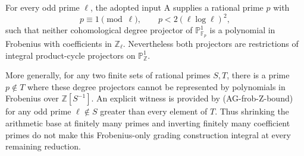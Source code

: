 \begin{proposition}
For every odd prime $\ell$, the adopted input A supplies
a rational prime $p$ with
\[
                p\equiv1\pmod\ell,
                     \qquad p<2(\ell\log\ell)^2,
\tag{AG-frob-Z-bound}
\]
such that neither cohomological degree projector of
$\mathbb P^1_{\mathbb F_p}$ is a polynomial in
Frobenius with coefficients in $\mathbb Z_\ell$.
Nevertheless both projectors are restrictions of
integral product-cycle projectors on
$\mathbb P^1_{\mathbb Z}$.

More generally, for any two finite sets of rational
primes $S,T$, there is a prime $p\notin T$ where
these degree projectors cannot be represented by
polynomials in Frobenius over $\mathbb Z[S^{-1}]$.
An explicit witness is provided by (AG-frob-Z-bound)
for any odd prime $\ell\notin S$ greater than every
element of $T$.  Thus shrinking the arithmetic base
at finitely many primes and inverting finitely many
coefficient primes do not make this Frobenius-only
grading construction integral at every remaining
reduction.
\end{proposition}
